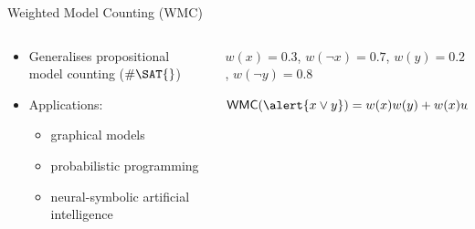 \documentclass{beamer}
\begin{document}
\begin{frame}[fragile]{Weighted Model Counting (WMC)}
  \begin{columns}
    \begin{column}{0.5\textwidth}
      \begin{itemize}
      \item Generalises propositional model counting ($\#\SAT{}$)
      \item Applications:
        \begin{itemize}
        \item graphical models
        \item probabilistic programming
        \item neural-symbolic artificial intelligence
        \end{itemize}
      \end{itemize}
    \end{column}
    \begin{column}{0.5\textwidth}
      \begin{example}
      $w(x) = 0.3$, $w(\neg x) = 0.7$, $w(y) = 0.2$, $w(\neg y) = 0.8$
      \vspace{1cm}

      $\mathsf{WMC}(\alert{x \lor y}) = w(x)w(y) + w(x)w(\neg y) + w(\neg x)w(y)
      = 0.44$
      \end{example}
    \end{column}
  \end{columns}
\end{frame}
\end{document}

